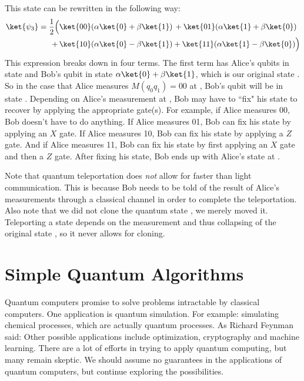 \documentclass[11pt, notitlepage]{report}
\begin{document}
This state can be rewritten in the following way:
\begin{align*}
  \ket{\psi_3} = \dfrac{1}{2}\Big(&\ket{00}(\alpha\ket{0} + \beta{\ket{1}}) \, + \ket{01}(\alpha\ket{1} + \beta\ket{0}) \\
  + \, &\ket{10}(\alpha\ket{0} - \beta\ket{1}) + \ket{11}(\alpha\ket{1} - \beta\ket{0})\Big)
\end{align*}
This expression breaks down in four terms. The first term has Alice's qubits in state  and Bob's qubit in state $\alpha\ket{0} + \beta\ket{1}$, which is our original state \ket{\phi}. So in the case that Alice measures $M(q_0q_1) = 00$ at , Bob's qubit will be in state \ket{\phi}. Depending on Alice's measurement at , Bob may have to ``fix" his state to recover \ket{\phi} by applying the appropriate gate(s). For example, if Alice measures 00, Bob doesn't have to do anything. If Alice measures 01, Bob can fix his state by applying an $X$ gate. If Alice measures 10, Bob can fix his state by applying a $Z$ gate. And if Alice measures 11, Bob can fix his state by first applying an $X$ gate and then a $Z$ gate. After fixing his state, Bob ends up with Alice's state \ket{\phi} at .

Note that quantum teleportation does \emph{not} allow for faster than light communication. This is because Bob needs to be told of the result of Alice's measurements through a classical channel in order to complete the teleportation. Also note that we did not clone the quantum state \ket{\phi}, we merely moved it. Teleporting a state depends on the measurement and thus collapsing of the original state \ket{\phi}, so it never allows for cloning.

\chapter{Simple Quantum Algorithms}
Quantum computers promise to solve problems intractable by classical computers. One application is quantum simulation. For example: simulating chemical processes, which are actually quantum processes. As Richard Feynman said:  Other possible applications include optimization, cryptography and machine learning. There are a lot of efforts in trying to apply quantum computing, but many remain skeptic. We should assume no guarantees in the applications of quantum computers, but continue exploring the possibilities.
\end{document}
